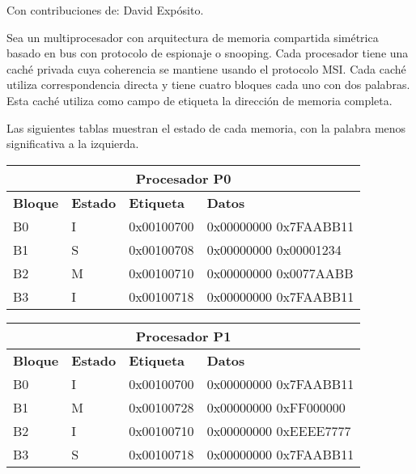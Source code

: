 \begin{acexercise}\end{acexercise}
Con contribuciones de: David Expósito.
\label{ex:m5-01:msi-01}

Sea un multiprocesador con arquitectura de memoria compartida simétrica basado
en bus con protocolo de espionaje o snooping. Cada procesador tiene una caché
privada cuya coherencia se mantiene usando el protocolo MSI. Cada caché utiliza
correspondencia directa y tiene cuatro bloques cada uno con dos palabras. Esta
caché utiliza como campo de etiqueta la dirección de memoria completa.

Las siguientes tablas muestran el estado de cada memoria, con la palabra menos
significativa a la izquierda.

\medskip

\begin{tabular}{|l|l|l|l|}
\hline
\multicolumn{4}{|c|}{Procesador P0}\\
\hline
\textbf{Bloque} &
\textbf{Estado} &
\textbf{Etiqueta} &
\textbf{Datos}
\\
\hline
\hline

B0 & I & 0x00100700 & 0x00000000 0x7FAABB11\\
\hline

B1 & S & 0x00100708 & 0x00000000 0x00001234\\
\hline

B2 & M & 0x00100710 & 0x00000000 0x0077AABB\\
\hline

B3 & I & 0x00100718 & 0x00000000 0x7FAABB11\\
\hline
\end{tabular}

\medskip

\begin{tabular}{|l|l|l|l|}
\hline
\multicolumn{4}{|c|}{Procesador P1}\\
\hline
\textbf{Bloque} &
\textbf{Estado} &
\textbf{Etiqueta} &
\textbf{Datos}
\\
\hline
\hline

B0 & I & 0x00100700 & 0x00000000 0x7FAABB11\\
\hline
B1 & M & 0x00100728 & 0x00000000 0xFF000000\\
\hline
B2 & I & 0x00100710 & 0x00000000 0xEEEE7777\\
\hline
B3 & S & 0x00100718 & 0x00000000 0x7FAABB11\\
\hline
\end{tabular}

